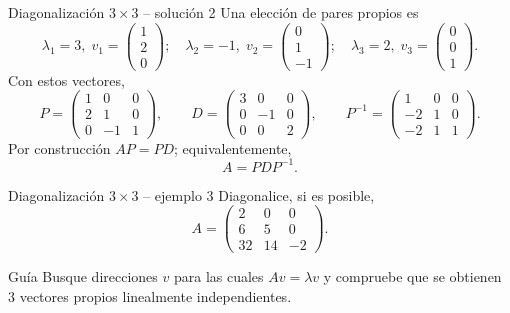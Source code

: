 \documentclass[aspectratio=169,10pt]{beamer}
\begin{document}
\begin{frame}{Diagonalización $3\times 3$ -- solución 2}
\scriptsize
Una elección de pares propios es
\[
\lambda_1=3,\;v_1=\begin{pmatrix}1\\2\\0\end{pmatrix};\quad \lambda_2=-1,\;v_2=\begin{pmatrix}0\\1\\-1\end{pmatrix};\quad \lambda_3=2,\;v_3=\begin{pmatrix}0\\0\\1\end{pmatrix}.
\]
Con estos vectores,
\[
P=\begin{pmatrix}1 & 0 & 0\\2 & 1 & 0\\0 & -1 & 1\end{pmatrix},\qquad D=\begin{pmatrix}3 & 0 & 0\\0 & -1 & 0\\0 & 0 & 2\end{pmatrix},\qquad P^{-1}=\begin{pmatrix}1 & 0 & 0\\-2 & 1 & 0\\-2 & 1 & 1\end{pmatrix}.
\]
Por construcción $AP=PD$; equivalentemente,
\[
\boxed{A=PDP^{-1}}.
\]
\end{frame}
\begin{frame}{Diagonalización $3\times 3$ -- ejemplo 3}
\small
Diagonalice, si es posible,
\[
A=\begin{pmatrix}2 & 0 & 0\\6 & 5 & 0\\32 & 14 & -2\end{pmatrix}.
\]
\begin{block}{Guía}
Busque direcciones $v$ para las cuales $Av=\lambda v$ y compruebe que se obtienen $3$ vectores propios linealmente independientes.
\end{block}
\end{frame}
\end{document}
